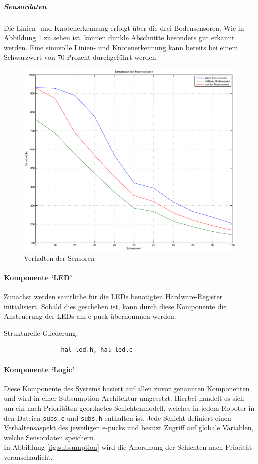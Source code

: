 \documentclass[10pt,a4paper]{article}
\begin{document}
			\subparagraph*{Sensordaten}
				Die Linien- und Knotenerkennung erfolgt über die drei Bodensensoren. Wie in Abbildung \ref{fig:auswertung} zu sehen ist,
				können dunkle Abschnitte besonders gut erkannt werden. Eine sinnvolle Linien- und Knotenerkennung kann bereits bei einem Schwarzwert von
				70 Prozent durchgeführt werden.
				\begin{figure}[h]
					\centering
					\includegraphics[width=18cm]{images/sensorgrafik.eps}
					\caption{Verhalten der Sensoren}		
					\label{fig:auswertung}	
				\end{figure}
			
			\paragraph*{Komponente `LED'}
			Zunächst werden sämtliche für die LEDs benötigten Hardware-Register initialisiert. Sobald dies geschehen ist, kann durch diese Komponente
			die Ansteuerung der LEDs am e-puck übernommen werden.
			
			Strukturelle Gliederung:
				\begin{verbatim}  
				hal_led.h, hal_led.c
				\end{verbatim}

		\paragraph*{Komponente `Logic'}
			Diese Komponente des Systems basiert auf allen zuvor genannten Komponenten und wird in einer Subsumption-Architektur umgesetzt. Hierbei
			handelt es sich um ein nach Prioritäten geordnetes Schichtenmodell, welches in jedem Roboter in den Dateien \texttt{subs.c} und 
			\texttt{subs.h} enthalten ist. Jede Schicht definiert einen Verhaltensaspekt des jeweiligen e-pucks und besitzt Zugriff auf globale Variablen,
			welche Sensordaten speichern. \\
            In Abbildung \ref{fig:subsumption} wird die Anordnung der Schichten nach Priorität veranschaulicht. \\ 
\end{document}
